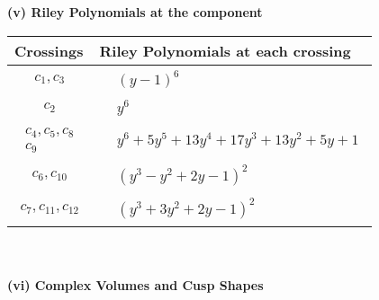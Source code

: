 \documentclass[1p]{elsarticle_modified}
\theoremstyle{definition}
\begin{document}
\newpage\renewcommand{\arraystretch}{1}
\flushleft \textbf{(v) Riley Polynomials at the component}\newline \\
\begin{tabular}{m{50pt}|m{274pt}}
Crossings & \hspace{64pt}Riley Polynomials at each crossing \\
\hline $$\begin{aligned}c_{1},c_{3}\end{aligned}$$&$\begin{aligned}
&(y-1)^6
\end{aligned}$\\
\hline $$\begin{aligned}c_{2}\end{aligned}$$&$\begin{aligned}
&y^6
\end{aligned}$\\
\hline $$\begin{aligned}c_{4},c_{5},c_{8}\\c_{9}\end{aligned}$$&$\begin{aligned}
&y^6+5 y^5+13 y^4+17 y^3+13 y^2+5 y+1
\end{aligned}$\\
\hline $$\begin{aligned}c_{6},c_{10}\end{aligned}$$&$\begin{aligned}
&(y^3- y^2+2 y-1)^2
\end{aligned}$\\
\hline $$\begin{aligned}c_{7},c_{11},c_{12}\end{aligned}$$&$\begin{aligned}
&(y^3+3 y^2+2 y-1)^2
\end{aligned}$\\
\hline
\end{tabular}\\~\\
\newpage\flushleft \textbf{(vi) Complex Volumes and Cusp Shapes}
\end{document}
